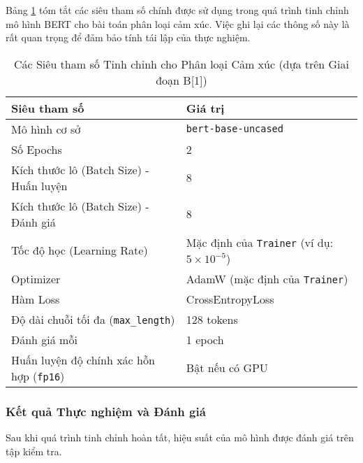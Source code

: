 Bảng \ref{tab:finetuning_hyperparams_rewrite} tóm tắt các siêu tham số chính được sử dụng trong quá trình tinh chỉnh mô hình BERT cho bài toán phân loại cảm xúc. Việc ghi lại các thông số này là rất quan trọng để đảm bảo tính tái lập của thực nghiệm.

\begin{table}[H]
\centering
\caption{Các Siêu tham số Tinh chỉnh cho Phân loại Cảm xúc (dựa trên Giai đoạn B[1])}
\label{tab:finetuning_hyperparams_rewrite}
\begin{tabular}{ll}
\toprule
\textbf{Siêu tham số} & \textbf{Giá trị} \\
\midrule
Mô hình cơ sở & \texttt{bert-base-uncased} \\
Số Epochs & 2 \\
Kích thước lô (Batch Size) - Huấn luyện & 8 \\
Kích thước lô (Batch Size) - Đánh giá & 8 \\
Tốc độ học (Learning Rate) & Mặc định của \texttt{Trainer} (ví dụ: $5 \times 10^{-5}$) \\
Optimizer & AdamW (mặc định của \texttt{Trainer}) \\
Hàm Loss & CrossEntropyLoss \\
Độ dài chuỗi tối đa (\texttt{max\_length}) & 128 tokens \\
Đánh giá mỗi & 1 epoch \\
Huấn luyện độ chính xác hỗn hợp (\texttt{fp16}) & Bật nếu có GPU \\
\bottomrule
\end{tabular}
\end{table}

\subsubsection{Kết quả Thực nghiệm và Đánh giá}
\label{sssec:ket_qua_thuc_nghiem_danh_gia_rewrite}
Sau khi quá trình tinh chỉnh hoàn tất, hiệu suất của mô hình được đánh giá trên tập kiểm tra.

